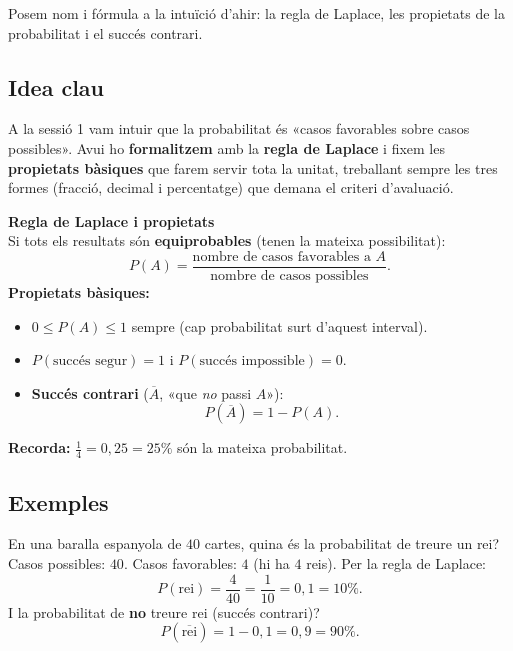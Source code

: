 %
{Posem nom i fórmula a la intuïció d'ahir: la regla de Laplace, les propietats de la probabilitat i el succés contrari.}

\subsection{Idea clau}

A la sessió 1 vam intuir que la probabilitat és «casos favorables sobre casos
possibles». Avui ho \textbf{formalitzem} amb la \textbf{regla de Laplace} i fixem les
\textbf{propietats bàsiques} que farem servir tota la unitat, treballant sempre les
tres formes (fracció, decimal i percentatge) que demana el criteri d'avaluació.

\begin{idea}
\textbf{Regla de Laplace i propietats}\\
Si tots els resultats són \textbf{equiprobables} (tenen la mateixa possibilitat):
\[
P(A)=\frac{\text{nombre de casos favorables a }A}{\text{nombre de casos possibles}}.
\]
\textbf{Propietats bàsiques:}
\begin{itemize}[leftmargin=1.4em, itemsep=2pt]
  \item $0\le P(A)\le 1$ sempre (cap probabilitat surt d'aquest interval).
  \item $P(\text{succés segur})=1$ \quad i \quad $P(\text{succés impossible})=0$.
  \item \textbf{Succés contrari} ($\overline{A}$, «que \emph{no} passi $A$»):
        \[
        P(\overline{A})=1-P(A).
        \]
\end{itemize}
\textbf{Recorda:} $\frac{1}{4}=0,25=25\%$ són la mateixa probabilitat.
\end{idea}

\subsection{Exemples}

\begin{exemple}
En una baralla espanyola de $40$ cartes, quina és la probabilitat de treure un rei?
Casos possibles: $40$. Casos favorables: $4$ (hi ha $4$ reis). Per la regla de Laplace:
\[
P(\text{rei})=\frac{4}{40}=\frac{1}{10}=0,1=10\%.
\]
I la probabilitat de \textbf{no} treure rei (succés contrari)?
\[
P(\overline{\text{rei}})=1-0,1=0,9=90\%.
\]
\end{exemple}

